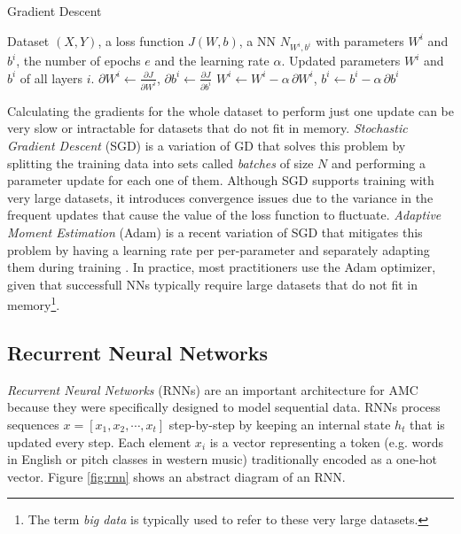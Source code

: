 \begin{algorithm}[t]
\caption{Gradient Descent}
\label{alg:grad_desc}
\begin{algorithmic}[1]
\REQUIRE Dataset $(X, Y)$, a loss function $J(W,b)$, a NN $N_{W^i,b^i}$ with
parameters $W^i$ and $b^i$, the number of epochs $e$ and the learning rate $\alpha$.
\ENSURE Updated parameters $W^i$ and $b^i$ of all layers $i$.
       \STATE $\partial W^i \gets \frac{\partial J}{\partial W^i}$, $\partial b^i \gets \frac{\partial J}{\partial b^i}$ \label{line:grad}
       \STATE $W^i \gets W^i - \alpha \, \partial W^i$, $b^i \gets b^i - \alpha \, \partial b^i$ \label{line:update}
\ENDFOR
\end{algorithmic}
\end{algorithm}

Calculating the gradients for the whole dataset to perform just one update can be very slow or intractable for datasets that do not fit in memory. \textit{Stochastic Gradient Descent} (SGD) is a variation of GD that solves this problem by splitting the training data into sets called \textit{batches} of size $N$ and performing a parameter update for each one of them.  Although SGD supports training with very large datasets, it introduces convergence issues due to the variance in the frequent updates that cause the value of the loss function to fluctuate. \textit{Adaptive Moment Estimation} (Adam) is a recent variation of SGD that mitigates this problem by having a learning rate per per-parameter and separately adapting them during training \cite{kingma2014adam}. In practice, most practitioners use the Adam optimizer, given that successfull NNs typically require large datasets that do not fit in memory\footnote{The term \textit{big data} is typically used to refer to these very large datasets.}.

\subsection{Recurrent Neural Networks}
\label{sec:rnns}

\textit{Recurrent Neural Networks} (RNNs) are an important architecture for AMC because they were specifically designed to model sequential data. RNNs process sequences $x = [x_1, x_2, \cdots, x_t]$ step-by-step by keeping an internal state $h_t$ that is updated every step. Each element $x_i$ is a vector representing a token (e.g. words in English or pitch classes in western music) traditionally encoded as a one-hot vector. Figure \ref{fig:rnn} shows an abstract diagram of an RNN.

